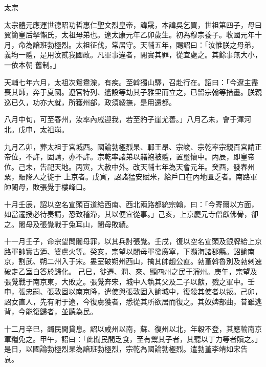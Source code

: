 
\begin{pinyinscope}

 太宗



 太宗體元應運世德昭功哲惠仁聖文烈皇帝，諱晟，本諱吳乞買，世祖第四子，母曰翼簡皇后拏懶氏，太祖母弟也。遼太康元年乙卯歲生。初為穆宗養子。收國元年十月，命為諳班勃極烈。太祖征伐，常居守。天輔五年，賜詔曰：「汝惟朕之母弟，義均一體，是用汝貳我國政。凡軍事違者，閱實其罪，從宜處之。其餘事無大小，一依本朝
 舊制。」



 天輔七年六月，太祖次鴛鴦濼，有疾。至斡獨山驛，召赴行在。詔曰：「今遼主盡喪其師，奔于夏國。遼官特列、遙設等劫其子雅里而立之，已留宗翰等措畫。朕親巡已久，功亦大就，所獲州部，政須綏撫，是用還都。



 八月中旬，可至春州，汝率內戚迎我，若至豹子崖尤善。」八月乙未，會于渾河北。戊申，太祖崩。



 九月乙卯，葬太祖于宮城西。國論勃極烈杲、鄆王昂、宗峻、宗乾率宗親百宮請正帝位，不許，固請，亦不許。宗乾率諸弟以赭袍被體，置璽懷中。丙辰，即皇帝位。己未，告祀天地。丙寅，大赦中外。改天輔七年為天會元年。癸酉，發春州粟，賑降人之徙于
 上京者。戊寅，詔諸猛安賦米，給戶口在內地匱乏者。南路軍帥闍母，敗張覺于樓峰口。



 十月壬辰，詔以空名宣頭百道給西南、西北兩路都統宗翰，曰：「今寄爾以方面，如當遷授必待奏請，恐致稽滯，其以便宜從事。」己亥，上京慶元寺僧獻佛骨，卻之。闍母及張覺戰于兔耳山，闍母敗績。



 十一月壬子，命宗望問闍母罪，以其兵討張覺。壬戌，復以空名宣頭及銀牌給上京路軍帥實古迺、婆盧火等。癸亥，宗望以闍母軍發廣寧，下瀕海諸郡縣。詔諭南京，割武、朔二州入于宋。婁室破朔州西山，擒其帥趙公直。勃堇斡魯別及勃剌速破走乙室白答於歸化。
 己巳，徙遷、潤、來、顯四州之民于瀋州。庚午，宗望及張覺戰于南京東，大敗之。張覺奔宋，城中人執其父及二子以獻，戮之軍中。壬申，張忠嗣、張敦固以南京降，遣使與張敦固入諭城中，復殺其使者以叛。己卯，詔女直人，先有附于遼，今復虜獲者，悉從其所欲居而復之。其奴婢部曲，昔雖逃背，今能復歸者，並聽為民。



 十二月辛巳，蠲民間貸息。詔以咸州以南，蘇、復州以北，年穀不登，其應輸南京軍糧免之。甲午，詔曰：「此聞民間乏食，至有鬻其子者，其聽以丁力等者贖之。」是日，以國論勃極烈杲為諳班勃極烈，宗乾為國論勃極烈。遣勃堇李靖如宋告
 哀。




\end{pinyinscope}
